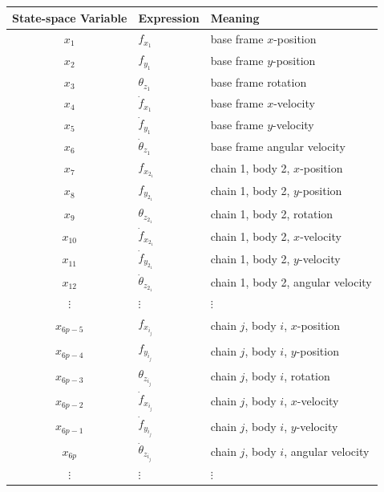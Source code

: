 \documentclass[11pt]{article}
\theoremstyle{definition}
\begin{document}
\begin{center}
\begin{tabular}{cll}
\toprule
State-space Variable & Expression & Meaning \\
\midrule
$x_1$       & $f_{x_1}$                  & base frame $x$-position \\
$x_2$       & $f_{y_1}$                  & base frame $y$-position \\
$x_3$       & $\theta_{z_1}$             & base frame rotation \\
$x_4$       & $\dot{f}_{x_1}$            & base frame $x$-velocity \\
$x_5$       & $\dot{f}_{y_1}$            & base frame $y$-velocity \\
$x_6$       & $\dot{\theta}_{z_1}$       & base frame angular velocity \\
$x_7$       & $f_{x_{2_1}}$              & chain 1, body 2, $x$-position \\
$x_8$       & $f_{y_{2_1}}$              & chain 1, body 2, $y$-position \\
$x_9$       & $\theta_{z_{2_1}}$         & chain 1, body 2, rotation \\
$x_{10}$    & $\dot{f}_{x_{2_1}}$        & chain 1, body 2, $x$-velocity \\
$x_{11}$    & $\dot{f}_{y_{2_1}}$        & chain 1, body 2, $y$-velocity \\
$x_{12}$    & $\dot{\theta}_{z_{2_1}}$   & chain 1, body 2, angular velocity \\
$\vdots$    & $\vdots$                   & $\vdots$ \\
$x_{6p-5}$  & $f_{x_{i_j}}$              & chain $j$, body $i$, $x$-position \\
$x_{6p-4}$  & $f_{y_{i_j}}$              & chain $j$, body $i$, $y$-position \\
$x_{6p-3}$  & $\theta_{z_{i_j}}$         & chain $j$, body $i$, rotation \\
$x_{6p-2}$  & $\dot{f}_{x_{i_j}}$        & chain $j$, body $i$, $x$-velocity \\
$x_{6p-1}$  & $\dot{f}_{y_{i_j}}$        & chain $j$, body $i$, $y$-velocity \\
$x_{6p}$    & $\dot{\theta}_{z_{i_j}}$   & chain $j$, body $i$, angular velocity \\
$\vdots$    & $\vdots$                   & $\vdots$ \\
\bottomrule
\end{tabular}
\end{center}
\end{document}
